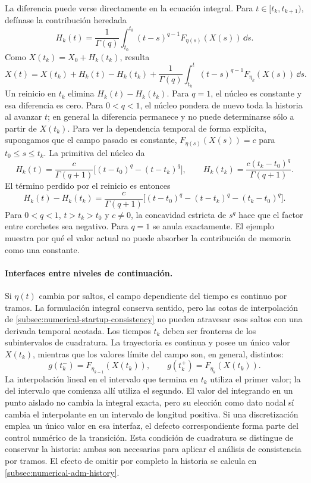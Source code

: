 La diferencia puede verse directamente en la ecuación integral. Para
\(t\in[t_k,t_{k+1})\), defínase la contribución heredada
\[
 H_k(t)=\frac1{\Gamma(q)}\int_{t_0}^{t_k}
 (t-s)^{q-1}F_{\eta(s)}(X(s))\,\dd s.
\]
Como \(X(t_k)=X_0+H_k(t_k)\), resulta
\begin{equation}
 X(t)=X(t_k)+H_k(t)-H_k(t_k)
 +\frac1{\Gamma(q)}\int_{t_k}^{t}(t-s)^{q-1}
                 F_{\eta_k}(X(s))\,\dd s.
 \label{eq:continuacion_memoria_heredada}
\end{equation}
Un reinicio en \(t_k\) elimina \(H_k(t)-H_k(t_k)\). Para \(q=1\), el
núcleo es constante y esa diferencia es cero. Para \(0<q<1\), el núcleo
pondera de nuevo toda la historia al avanzar \(t\); en general la diferencia
permanece y no puede determinarse sólo a partir de \(X(t_k)\).
Para ver la dependencia temporal de forma explícita, supongamos que el campo
pasado es constante, \(F_{\eta(s)}(X(s))=c\) para \(t_0\le s\le t_k\).
La primitiva del núcleo da
\[
 H_k(t)=\frac{c}{\Gamma(q+1)}
 \bigl[(t-t_0)^q-(t-t_k)^q\bigr],\qquad
 H_k(t_k)=\frac{c(t_k-t_0)^q}{\Gamma(q+1)}.
\]
El término perdido por el reinicio es entonces
\begin{equation}
 H_k(t)-H_k(t_k)=\frac{c}{\Gamma(q+1)}
 \bigl[(t-t_0)^q-(t-t_k)^q-(t_k-t_0)^q\bigr].
 \label{eq:continuacion-defecto-historia-constante}
\end{equation}
Para \(0<q<1\), \(t>t_k>t_0\) y \(c\ne0\), la concavidad estricta de
\(s^q\) hace que el factor entre corchetes sea negativo. Para \(q=1\)
se anula exactamente. El ejemplo muestra por qué el valor actual no puede
absorber la contribución de memoria como una constante.

\paragraph{Interfaces entre niveles de continuación.}
\label{subsec:numerical-continuation-interfaces}
Si \(\eta(t)\) cambia por saltos, el campo dependiente del tiempo es continuo
por tramos. La formulación integral conserva sentido, pero las cotas de
interpolación de \cref{subsec:numerical-startup-consistency} no pueden
atravesar esos saltos con una derivada temporal acotada. Los tiempos \(t_k\)
deben ser fronteras de los subintervalos de cuadratura. La trayectoria es
continua y posee un único valor \(X(t_k)\), mientras que los valores límite
del campo son, en general, distintos:
\[
 g(t_k^-)=F_{\eta_{k-1}}(X(t_k)),\qquad
 g(t_k^+)=F_{\eta_k}(X(t_k)).
\]
La interpolación lineal en el intervalo que termina en \(t_k\) utiliza el
primer valor; la del intervalo que comienza allí utiliza el segundo. El
valor del integrando en un punto aislado no cambia la integral exacta, pero
su elección como dato nodal sí cambia el interpolante en un intervalo de
longitud positiva. Si una discretización emplea un único valor en esa
interfaz, el defecto correspondiente forma parte del control numérico de la
transición. Esta condición de cuadratura se distingue de conservar la
historia: ambas son necesarias para aplicar el análisis de consistencia
por tramos. El efecto de omitir por completo la historia se calcula en
\cref{subsec:numerical-adm-history}.

